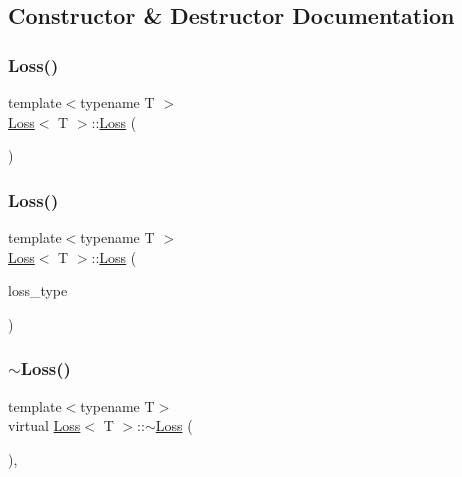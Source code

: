 \subsection{Constructor \& Destructor Documentation}
\mbox{\label{class_loss_a76394ddc3da09eb5d4929e1ea03a667c}} 
\subsubsection{\texorpdfstring{Loss()}{Loss()}\hspace{0.1cm}{\footnotesize\ttfamily [1/2]}}
{\footnotesize\ttfamily template$<$typename T $>$ \\
\mbox{\hyperlink{class_loss}{Loss}}$<$ T $>$\+::\mbox{\hyperlink{class_loss}{Loss}} (\begin{DoxyParamCaption}{ }\end{DoxyParamCaption})}

\mbox{\label{class_loss_a5b75c55ce90781d1b12d02f1bedbfa4f}} 
\subsubsection{\texorpdfstring{Loss()}{Loss()}\hspace{0.1cm}{\footnotesize\ttfamily [2/2]}}
{\footnotesize\ttfamily template$<$typename T $>$ \\
\mbox{\hyperlink{class_loss}{Loss}}$<$ T $>$\+::\mbox{\hyperlink{class_loss}{Loss}} (\begin{DoxyParamCaption}\item[{\mbox{\hyperlink{loss_8hpp_a72b6675b9bd68360ebc6e54006d8220f}{L\+O\+S\+S\+\_\+\+T\+Y\+PE}}}]{loss\+\_\+type }\end{DoxyParamCaption})}

\mbox{\label{class_loss_a93b96fb49b4fedae50e1b275062d9cc5}} 
\subsubsection{\texorpdfstring{$\sim$Loss()}{~Loss()}}
{\footnotesize\ttfamily template$<$typename T$>$ \\
virtual \mbox{\hyperlink{class_loss}{Loss}}$<$ T $>$\+::$\sim$\mbox{\hyperlink{class_loss}{Loss}} (\begin{DoxyParamCaption}{ }\end{DoxyParamCaption})\hspace{0.3cm}{\ttfamily [virtual]}, {\ttfamily [default]}}



